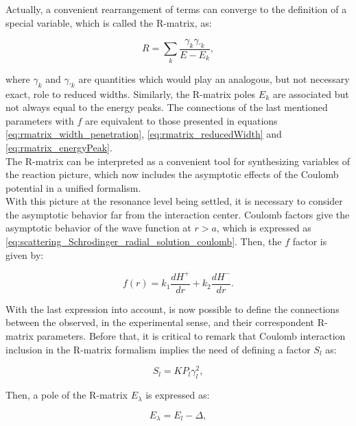 \documentclass[openany]{book}
\begin{document}
Actually, a convenient rearrangement of terms can converge to the definition of a special variable, which is called the R-matrix, as: 

\begin{equation}  \label{eq:rmatrix_definition1}
	R= \sum_k {\frac{\gamma_{k} \gamma_{'k}}{E - E_k}}, 
\end{equation}

where $\gamma_{k} $ and $\gamma_{'k}$ are quantities which would play an analogous, but not necessary exact, role to reduced widths. Similarly, the R-matrix poles $E_k$ are associated but not always equal to the energy peaks. The connections of the last mentioned parameters with $f$ are equivalent to those presented in equations \ref{eq:rmatrix_width_penetration},     \ref{eq:rmatrix_reducedWidth} and \ref{eq:rmatrix_energyPeak}.   \\

The R-matrix can be interpreted as a convenient tool for synthesizing variables of the reaction picture, which now includes the asymptotic effects of the Coulomb potential in a unified formalism. \\

With this picture at the resonance level being settled, it is necessary to consider the asymptotic behavior far from the interaction center. Coulomb factors give the asymptotic behavior of the wave function at $r > a$, which is expressed as \ref{eq:scattering_Schrodinger_radial_solution_coulomb}. Then, the $f$ factor is given by: 

\begin{equation}   \label{eq:rmatrix_f_Coulomb}
	f(r) = k_1\frac{dH^{+}}{dr}  + k_2 \frac{dH^{-}}{dr}.
\end{equation}

With the last expression into account, is now possible to define the connections between the observed, in the experimental sense, and their correspondent R-matrix parameters. Before that, it is critical to remark that Coulomb interaction inclusion in the R-matrix formalism implies the need of defining a factor $S_l$ as:

\begin{equation}   \label{eq:rmatrix_shiftFactor}
	S_l= K P_l\gamma^2_l,
\end{equation}

Then, a pole of the R-matrix $E_\lambda$ is expressed as: 

\begin{equation}  \label{eq:rmatrix_energyPole}
	E_\lambda =  E_l - \Delta, 
\end{equation}
\end{document}
